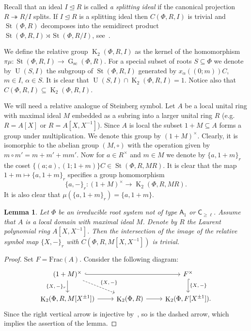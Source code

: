 \documentclass[oneside, 10pt]{amsart}
\DeclareMathOperator{\St}{St}
\DeclareMathOperator{\G}{G}
\DeclareMathOperator{\UU}{U}
\newcommand{\Gsc}{\G_\mathrm{sc}}
\DeclareMathOperator{\K}{K}
\newcommand{\rA}{\mathsf{A}}
\newcommand{\rC}{\mathsf{C}}
\newcommand{\inv}{^{-1}}
\numberwithin{equation}{section}
\numberwithin{thm}{section}
\newtheorem{lemma}[thm]{Lemma}
\numberwithin{lemma}{section}
\theoremstyle{definition}
\theoremstyle{remark}
\begin{document}
Recall that an ideal $I \trianglelefteq R$ is called \textit{a splitting ideal} if the canonical projection $R \twoheadrightarrow R/I$ splits.
If $I \trianglelefteq R$ is a splitting ideal then $C(\Phi, R, I)$ is trivial and $\St(\Phi, R)$ decomposes into the semidirect product
$\St(\Phi, R, I) \rtimes \St(\Phi, R/I)$, see~\cite[\S~1]{LS17}.

We define the relative group $\K_2(\Phi, R, I)$ as the kernel of the homomorphism $\pi \mu \colon \St(\Phi,R, I) \to \Gsc(\Phi, R)$.
For a special subset of roots $S \subseteq \Phi$ we denote by $\UU(S, I)$ the subgroup of $\St(\Phi, R, I)$ generated by $x_\alpha((0;m))C$, $m \in I$, $\alpha \in S$.
It is clear that $\UU(S, I) \cap \K_2(\Phi, R, I) = 1$.
Notice also that $C(\Phi, R, I) \subseteq \K_2(\Phi, R, I)$.

We will need a relative analogue of Steinberg symbol.
Let $A$ be a local unital ring with maximal ideal $M$ embedded as a subring into a larger unital ring $R$ (e.g. $R = A[X]$ or $R = A[X, X\inv]$).
Since $A$ is local the subset $1+M \subseteq A$ forms a group under multiplication.
We denote this group by $(1+M)^\times$.
Clearly, it is isomorphic to the abelian group $(M, \circ)$ with the operation given by $m \circ m' = m + m' + mm'$.
Now for $a \in R^\times$ and $m \in M$ we denote by $\{a, 1+m\}_r$ the coset $\{(a; a), (1; 1+m)\}C \in \St(\Phi, R, MR)$.
It is clear that the map $1+m \mapsto \{a, 1+m\}_r$ specifies a group homomorphism
\begin{equation} \label{eq:relative-symbol} \{ a, -\}_r \colon (1+M)^\times \to \K_2(\Phi, R, MR). \end{equation}
It is also clear that $\mu(\{a, 1+m\}_r) = \{a, 1+m\}$.

\begin{lemma}\label{lem:symbols}
Let $\Phi$ be an irreducible root system not of type $\rA_1$ or $\rC_{\geq \ell}$.
Assume that $A$ is a local domain with maximal ideal $M$.
Denote by $R$ the Laurent polynomial ring $A[X, X\inv]$.
Then the intersection of the image of the relative symbol map $\{X, -\}_r$ with $C(\Phi, R, M[X, X\inv])$ is trivial.
\end{lemma}
\begin{proof}
Set $F = \mathrm{Frac}(A)$.
Consider the following diagram:
\[\begin{tikzcd}
(1+M)^\times \ar[hookrightarrow, rr] \arrow{d}[swap]{\{X {,}\, -\}_r} \ar[rd, dashed, "\{X{,}\, -\}"] &  & F^\times \ar[hookrightarrow, d, "\{X{,}\, -\}"] \\
\K_2(\Phi ,R, M[X^{\pm 1}]) \ar[r] & \K_2(\Phi, R) \ar[r] & \K_2(\Phi, F[X^{\pm 1}]).
\end{tikzcd}\]
Since the right vertical arrow is injective by~\cite[Lemma~2.2]{LS20}, so is the dashed arrow,
 which implies the assertion of the lemma.
\end{proof}
\end{document}
